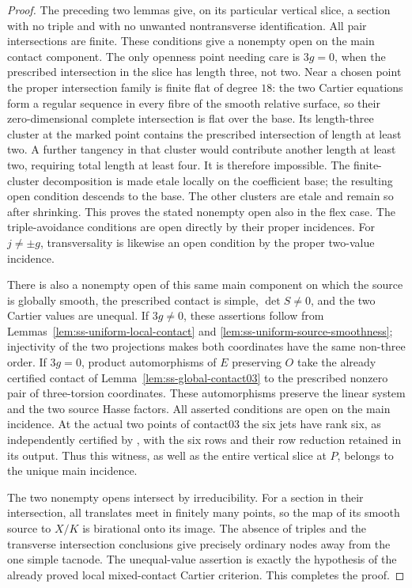 \begin{proof}
The preceding two lemmas give, on its particular vertical slice,
a section with no triple and with no unwanted nontransverse
identification. All pair intersections are finite. These conditions
give a nonempty open on the main contact component. The only
openness point needing care is $3g=0$, when the prescribed
intersection in the slice has length three, not two. Near a chosen
point the proper intersection family is finite flat of degree
$18$: the two Cartier equations form a regular sequence in every
fibre of the smooth relative surface, so their zero-dimensional
complete intersection is flat over the base. Its length-three cluster at the marked point
contains the prescribed intersection of length at least two.
A further tangency in that cluster would contribute another
length at least two, requiring total length at least four.
It is therefore impossible. The finite-cluster decomposition is
made etale locally on the coefficient base; the resulting open
condition descends to the base. The other clusters are etale and
remain so after shrinking. This proves the stated nonempty open also in
the flex case. The triple-avoidance conditions are open directly
by their proper incidences. For $j\ne\pm g$, transversality is
likewise an open condition by the proper two-value incidence.

There is also a nonempty open of this same main component on
which the source is globally smooth, the prescribed contact is
simple, $\det S\ne0$, and the two Cartier values are unequal.
If $3g\ne0$, these assertions follow from
Lemmas~\ref{lem:ss-uniform-local-contact} and
\ref{lem:ss-uniform-source-smoothness}; injectivity of the two
projections makes both coordinates have the same non-three order.
If $3g=0$, product automorphisms of $E$ preserving $O$ take the
already certified contact of Lemma~\ref{lem:ss-global-contact03}
to the prescribed nonzero pair of three-torsion coordinates.
These automorphisms preserve the linear system and the two source
Hasse factors. All asserted conditions are open on the main
incidence. At the actual two points of contact03 the six jets have
rank six, as independently certified by
,
with the six rows and their row reduction retained in its output.
Thus this witness, as well as the entire vertical slice at $P$,
belongs to the unique main incidence.

The two nonempty opens intersect by irreducibility. For a section
in their intersection, all translates meet in finitely many
points, so the map of its smooth source to $X/K$ is birational
onto its image. The absence of triples and the transverse
intersection conclusions give precisely ordinary nodes away from
the one simple tacnode. The unequal-value assertion is exactly
the hypothesis of the already proved local mixed-contact Cartier
criterion. This completes the proof.
\end{proof}

